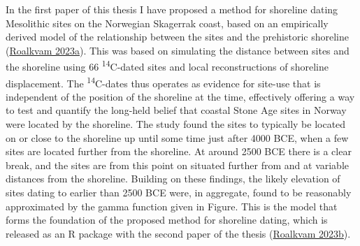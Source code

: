 \documentclass[
  12pt,
  a4paper,
  oneside]{book}
\begin{document}

In the first paper of this thesis I have proposed a method for shoreline dating Mesolithic sites on the Norwegian Skagerrak coast, based on an empirically derived model of the relationship between the sites and the prehistoric shoreline (\protect\hyperlink{ref-roalkvam2023}{Roalkvam 2023a}). This was based on simulating the distance between sites and the shoreline using 66 \textsuperscript{14}C-dated sites and local reconstructions of shoreline displacement. The \textsuperscript{14}C-dates thus operates as evidence for site-use that is independent of the position of the shoreline at the time, effectively offering a way to test and quantify the long-held belief that coastal Stone Age sites in Norway were located by the shoreline. The study found the sites to typically be located on or close to the shoreline up until some time just after 4000 BCE, when a few sites are located further from the shoreline. At around 2500 BCE there is a clear break, and the sites are from this point on situated further from and at variable distances from the shoreline. Building on these findings, the likely elevation of sites dating to earlier than 2500 BCE were, in aggregate, found to be reasonably approximated by the gamma function given in Figure. This is the model that forms the foundation of the proposed method for shoreline dating, which is released as an R package with the second paper of the thesis (\protect\hyperlink{ref-roalkvam2023b}{Roalkvam 2023b}).
\end{document}
